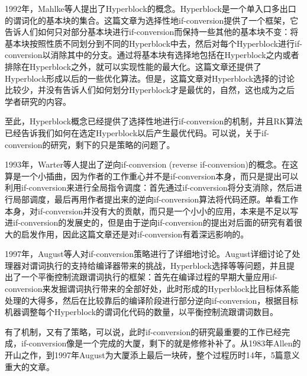 1992年，Mahlke等人提出了Hyperblock的概念\cite{ScottA.Mahlke1992a}。Hyperblock是一个单入口多出口的谓词化的基本块的集合。这篇文章为选择性地if-conversion提供了一个框架，它告诉人们如何只对部分基本块进行if-conversion而保持一些其他的基本块不变：将基本块按照性质不同划分到不同的Hyperblock中去，然后对每个Hyperblock进行if-conversion以消除其中的分支。通过将基本块有选择地包括在Hyperblock之内或者排除在Hyperblock之外，就可以实现性能的最大化。这篇文章还提供了Hyperblock形成以后的一些优化算法。但是，这篇文章对Hyperblock选择的讨论比较少，并没有告诉人们如何划分Hyperblock才是最优的，自然，这也成为之后学者研究的内容。

至此，Hyperblock概念已经提供了选择性地进行if-conversion的机制，并且RK算法已经告诉我们如何在选定Hyperblock以后产生最优代码。可以说，关于if-conversion的研究，剩下的只是策略的问题了。

1993年，Warter等人提出了逆向if-conversion (reverse if-conversion)的概念\cite{Warter1993}。在这算是一个小插曲，因为作者的工作重心并不是if-conversion本身，而只是提出可以利用if-conversion来进行全局指令调度：首先通过if-conversion将分支消除，然后进行局部调度，最后再用作者提出来的逆向if-conversion算法将代码还原。单看工作本身，对if-conversion并没有大的贡献，而只是一个小小的应用，本来是不足以写进if-conversion的发展史的，但是由于逆向if-conversion的提出对后面的研究有着很大的启发作用，因此这篇文章还是对if-conversion有着深远影响的。

1997年，August等人对if-conversion策略进行了详细地讨论\cite{August1997}。August详细讨论了处理器对谓词执行的支持给编译器带来的挑战，Hyperblock选择等等问题，并且提出了一个平衡控制流跟谓词执行的框架：首先在编译过程的早期大量应用if-conversion来发掘谓词执行带来的全部好处，此时形成的Hyperblock比目标体系能处理的大得多，然后在比较靠后的编译阶段进行部分逆向if-conversion，根据目标机器调整每个Hyperblock的谓词化代码的数量，以平衡控制流跟谓词数目。

有了机制，又有了策略，可以说，此时if-conversion的研究最重要的工作已经完成，if-conversion像是一个完成的大厦，剩下的就是修修补补了。从1983年Allen的开山之作，到1997年August为大厦添上最后一块砖，整个过程历时14年，5篇意义重大的文章。